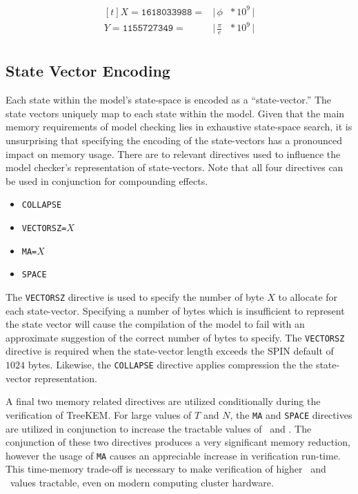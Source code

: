 \begin{equation}
\begin{aligned}[t]
X = \texttt{1618033988} = & \bigg | \, \phi          \!\!\!\! & * \, 10^9 \, \bigg |\\
Y = \texttt{1155727349} = & \bigg | \, \frac{\pi}{e} \!\!\!\! & * \, 10^9 \, \bigg |\\
\end{aligned}
\end{equation}


\hypertarget{state-vector-encoding}{%
\subsection{State Vector Encoding}\label{state-vector-encoding}}

Each state within the model's state-space is encoded as a ``state-vector.''
The state vectors uniquely map to each state within the model.
Given that the main memory requirements of model checking lies in exhaustive state-space search, it is unsurprising that specifying the encoding of the state-vectors has a pronounced impact on memory usage.
There are to relevant directives used to influence the model checker's representation of state-vectors.
Note that all four directives can be used in conjunction for compounding effects.

\begin{itemize}
\item \texttt{COLLAPSE}
\item \texttt{VECTORSZ=}\(X\)
\item \texttt{MA=}\(X\)
\item \texttt{SPACE}
\end{itemize}

The \texttt{VECTORSZ} directive is used to specify the number of byte \(X\) to allocate for each state-vector.
Specifying a number of bytes which is insufficient to represent the state vector will cause the compilation of the model to fail with an approximate suggestion of the correct number of bytes to specify.
The \texttt{VECTORSZ} directive is required when the state-vector length exceeds the SPIN default of \(1024\) bytes.
Likewise, the \texttt{COLLAPSE} directive applies compression the the state-vector representation.

A final two memory related directives are utilized conditionally during the verification of TreeKEM.\@
For large values of \(T\) and \(N\), the \texttt{MA} and \texttt{SPACE} directives are utilized in conjunction to increase the tractable values of \Tmax\ and \Nmax.
The conjunction of these two directives produces a very significant memory reduction, however the usage of \texttt{MA} causes an appreciable increase in verification run-time.
This time-memory trade-off is necessary to make verification of higher \Tmax\ and \Nmax\ values tractable, even on modern computing cluster hardware.

